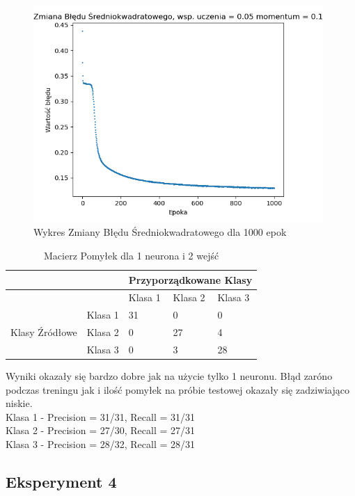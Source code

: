 \documentclass[12pt]{article}
\begin{document}
\newpage

\begin{figure}[!ht]
 \centering
 \includegraphics[width=11cm]{WykresBlad1neuron2wejscia.png}
 \caption{Wykres Zmiany Błędu Średniokwadratowego dla 1000 epok}
 \vspace{-0.1cm}
 \label{WykresBlad16}
\end{figure}

\begin{table}
\caption{\label{tab:tablica16} Macierz Pomyłek dla 1 neurona i 2 wejść}
\begin{tabular}{ |p{3cm}|p{3cm}|p{2cm}|p{2cm}|p{2cm}|  }
 \hline
 & & 
 \multicolumn{3}{|c|}{Przyporządkowane Klasy} \\
 \hline

   & & Klasa 1 & Klasa 2 & Klasa 3\\
 \hline
\multirow{3}{4em}{Klasy Źródłowe}
   & Klasa 1 & 31 & 0 & 0 \\ 
   & Klasa 2 & 0  & 27 & 4 \\
   & Klasa 3 & 0  & 3  & 28 \\
 \hline
\end{tabular}
\end{table}

Wyniki okazały się bardzo dobre jak na użycie tylko 1 neuronu. Błąd zaróno podczas treningu jak i ilość pomyłek na próbie testowej okazały się zadziwiająco niskie.
\\Klasa 1 - Precision = 31/31, Recall = 31/31\\
Klasa 2 - Precision = 27/30, Recall = 27/31\\
Klasa 3 - Precision = 28/32, Recall = 28/31\\

\newpage
\subsection {Eksperyment 4}
\end{document}
